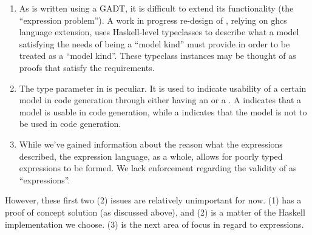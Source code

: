 \begin{enumerate}

	\item As \ModelKinds{} is written using a GADT, it is difficult to extend
	      its functionality (the ``expression problem''). A work in progress re-design of
	      \ModelKinds{}, relying on \acs{ghc}s \ConstraintKinds{}
	      \cite{ConstraintKindsGHC2020} language extension, uses Haskell-level
	      typeclasses to describe what a model satisfying the needs of being a
	      ``model kind'' must provide in order to be treated as a ``model
	      kind''. These typeclass instances may be thought of as proofs that
	      satisfy the requirements.

	\item The type parameter in \ModelKinds{} is peculiar. It is used to
	      indicate usability of a certain model in code generation through
	      either having an \Expr{} or a \ModelExpr{}. A  indicates that a model is usable in code generation, while a
	       indicates that the model is not to be
	      used in code generation.

	\item While we've gained information about the reason what the expressions
	      described, the expression language, as a whole, allows for poorly
	      typed expressions to be formed. We lack enforcement regarding the
	      validity of \Expr{} as ``expressions''.

\end{enumerate}

However, these first two (2) issues are relatively unimportant for now. (1) has
a proof of concept solution (as discussed above), and (2) is a matter of the
Haskell implementation we choose. (3) is the next area of focus in regard to
expressions.
